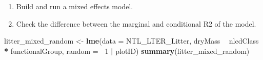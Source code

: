\documentclass[]{article}
\newenvironment{Shaded}{\begin{snugshade}}{\end{snugshade}}
\newcommand{\DataTypeTok}[1]{\textcolor[rgb]{0.13,0.29,0.53}{#1}}
\newcommand{\DecValTok}[1]{\textcolor[rgb]{0.00,0.00,0.81}{#1}}
\newcommand{\KeywordTok}[1]{\textcolor[rgb]{0.13,0.29,0.53}{\textbf{#1}}}
\newcommand{\NormalTok}[1]{#1}
\newcommand{\OperatorTok}[1]{\textcolor[rgb]{0.81,0.36,0.00}{\textbf{#1}}}
\newcommand{\StringTok}[1]{\textcolor[rgb]{0.31,0.60,0.02}{#1}}
\providecommand{\tightlist}{%
  \setlength{\itemsep}{0pt}\setlength{\parskip}{0pt}}
\begin{document}
\begin{enumerate}
\def\labelenumi{\alph{enumi}.}
\tightlist
\item
  Build and run a mixed effects model.
\item
  Check the difference between the marginal and conditional R2 of the
  model.
\end{enumerate}

\begin{Shaded}
\begin{Highlighting}[]
\NormalTok{litter_mixed_random <-}\StringTok{ }\KeywordTok{lme}\NormalTok{(}\DataTypeTok{data =}\NormalTok{ NTL_LTER_Litter,}
\NormalTok{                           dryMass }\OperatorTok{~}\StringTok{ }\NormalTok{nlcdClass }\OperatorTok{*}\StringTok{ }\NormalTok{functionalGroup,}
                           \DataTypeTok{random =} \OperatorTok{~}\DecValTok{1} \OperatorTok{|}\StringTok{ }\NormalTok{plotID)}
\KeywordTok{summary}\NormalTok{(litter_mixed_random)}
\end{Highlighting}
\end{Shaded}
\end{document}
